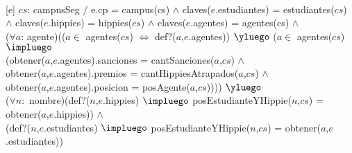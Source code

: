 \begin{Representacion}
  ~
  
  [e]
  {$cs$: campusSeg $/$ e.cp = campus(cs) $\land$ claves($e$.estudiantes) = estudiantes($cs$) \\ $\land$ claves($e$.hippies) = hippies($cs$) $\land$ claves($e$.agentes) = agentes(cs) $\land$ \\
  ($\forall a$: agente)(($a \in$ agentes($cs$) $\iff$ def?($a$,$e$.agentes)) $\yluego$ ($a \in$ agentes($cs$) $\impluego$ \\
  (obtener($a$,$e$.agentes).sanciones = cantSanciones($a$,$cs$) $\land$\\
  obtener($a$,$e$.agentes).premios = cantHippiesAtrapados($a$,$cs$) $\land$\\
  obtener($a$,$e$.agentes).posicion = posAgente($a$,$cs$)))) $\yluego$ \\
  ($\forall n:$ nombre)(def?($n$,$e$.hippies) $\impluego$ posEstudianteYHippie($n$,$cs$) = obtener($a$,$e$.hippies)) $\land$\\
  (def?($n$,$e$.estudiantes) $\impluego$ posEstudianteYHippie($n$,$cs$) = obtener($a$,$e$.estudiantes)) }


\begin{Algoritmos}



\end{Algoritmos}

\end{Representacion}

